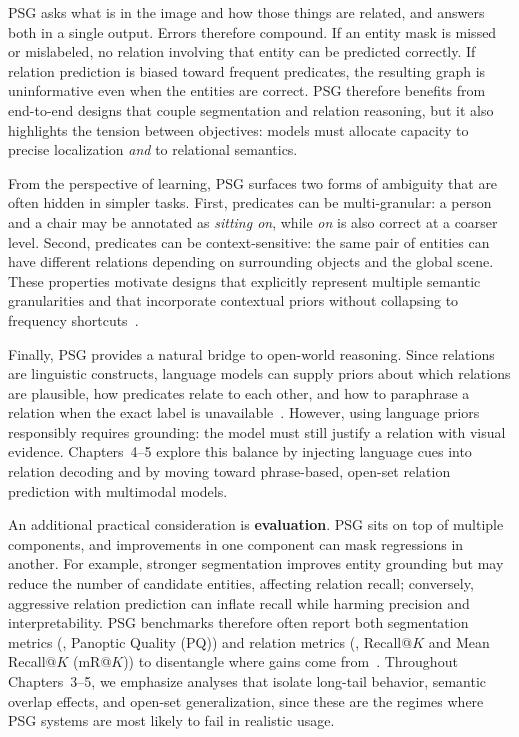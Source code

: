 PSG asks what is in the image and how those things are related, and answers both in a single output. Errors therefore compound. If an entity mask is missed or mislabeled, no relation involving that entity can be predicted correctly. If relation prediction is biased toward frequent predicates, the resulting graph is uninformative even when the entities are correct. PSG therefore benefits from end-to-end designs that couple segmentation and relation reasoning, but it also highlights the tension between objectives: models must allocate capacity to precise localization \emph{and} to relational semantics.

From the perspective of learning, PSG surfaces two forms of ambiguity that are often hidden in simpler tasks. First, predicates can be multi-granular: a person and a chair may be annotated as \emph{sitting on}, while \emph{on} is also correct at a coarser level. Second, predicates can be context-sensitive: the same pair of entities can have different relations depending on surrounding objects and the global scene. These properties motivate designs that explicitly represent multiple semantic granularities and that incorporate contextual priors without collapsing to frequency shortcuts~\citep{cheng2022visual, zhou2023hilo}.

Finally, PSG provides a natural bridge to open-world reasoning. Since relations are linguistic constructs, language models can supply priors about which relations are plausible, how predicates relate to each other, and how to paraphrase a relation when the exact label is unavailable~\citep{min2023recent, zhang2024vision}. However, using language priors responsibly requires grounding: the model must still justify a relation with visual evidence. Chapters~4--5 explore this balance by injecting language cues into relation decoding and by moving toward phrase-based, open-set relation prediction with multimodal models.

An additional practical consideration is \textbf{evaluation}. PSG sits on top of multiple components, and improvements in one component can mask regressions in another. For example, stronger segmentation improves entity grounding but may reduce the number of candidate entities, affecting relation recall; conversely, aggressive relation prediction can inflate recall while harming precision and interpretability. PSG benchmarks therefore often report both segmentation metrics (\eg, Panoptic Quality (PQ)) and relation metrics (\eg, Recall@$K$ and Mean Recall@$K$ (mR@$K$)) to disentangle where gains come from~\citep{kirillov2019panoptic, zellers2018neural, yang2022panoptic}. Throughout Chapters~3--5, we emphasize analyses that isolate long-tail behavior, semantic overlap effects, and open-set generalization, since these are the regimes where PSG systems are most likely to fail in realistic usage.

